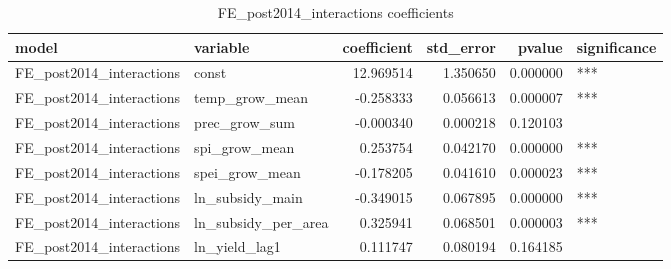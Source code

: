 \begin{table}
\caption{FE_post2014_interactions coefficients}
\label{tab:FE_post2014_interactions_coef}
\begin{tabular}{llrrrl}
\toprule
model & variable & coefficient & std_error & pvalue & significance \\
\midrule
FE_post2014_interactions & const & 12.969514 & 1.350650 & 0.000000 & *** \\
FE_post2014_interactions & temp_grow_mean & -0.258333 & 0.056613 & 0.000007 & *** \\
FE_post2014_interactions & prec_grow_sum & -0.000340 & 0.000218 & 0.120103 &  \\
FE_post2014_interactions & spi_grow_mean & 0.253754 & 0.042170 & 0.000000 & *** \\
FE_post2014_interactions & spei_grow_mean & -0.178205 & 0.041610 & 0.000023 & *** \\
FE_post2014_interactions & ln_subsidy_main & -0.349015 & 0.067895 & 0.000000 & *** \\
FE_post2014_interactions & ln_subsidy_per_area & 0.325941 & 0.068501 & 0.000003 & *** \\
FE_post2014_interactions & ln_yield_lag1 & 0.111747 & 0.080194 & 0.164185 &  \\
\bottomrule
\end{tabular}
\end{table}
